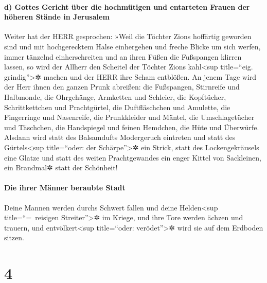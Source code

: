 \hypertarget{d-gottes-gericht-uxfcber-die-hochmuxfctigen-und-entarteten-frauen-der-huxf6heren-stuxe4nde-in-jerusalem}{%
\paragraph{d) Gottes Gericht über die hochmütigen und entarteten Frauen
der höheren Stände in
Jerusalem}\label{d-gottes-gericht-uxfcber-die-hochmuxfctigen-und-entarteten-frauen-der-huxf6heren-stuxe4nde-in-jerusalem}}

Weiter hat der HERR gesprochen: »Weil die Töchter Zions
hoffärtig geworden sind und mit hochgerecktem Halse einhergehen und
freche Blicke um sich werfen, immer tänzelnd einherschreiten und an
ihren Füßen die Fußspangen klirren lassen, so wird der
Allherr den Scheitel der Töchter Zions kahl\textless sup title=``eig.
grindig''\textgreater✲ machen und der HERR ihre Scham entblößen.
An jenem Tage wird der Herr ihnen den ganzen Prunk
abreißen: die Fußspangen, Stirnreife und Halbmonde, die
Ohrgehänge, Armketten und Schleier, die Kopftücher,
Schrittkettchen und Prachtgürtel, die Duftfläschchen und Amulette,
die Fingerringe und Nasenreife, die
Prunkkleider und Mäntel, die Umschlagetücher und Täschchen,
die Handspiegel und feinen Hemdchen, die Hüte und
Überwürfe. Alsdann wird statt des Balsamdufts Modergeruch
eintreten und statt des Gürtels\textless sup title=``oder: der
Schärpe''\textgreater✲ ein Strick, statt des Lockengekräusels eine
Glatze und statt des weiten Prachtgewandes ein enger Kittel von
Sackleinen, ein Brandmal✲ statt der Schönheit!

\hypertarget{die-ihrer-muxe4nner-beraubte-stadt}{%
\paragraph{Die ihrer Männer beraubte
Stadt}\label{die-ihrer-muxe4nner-beraubte-stadt}}

Deine Mannen werden durchs Schwert fallen und deine
Helden\textless sup title=``=~reisigen Streiter''\textgreater✲ im
Kriege, und ihre Tore werden ächzen und trauern, und
entvölkert\textless sup title=``oder: verödet''\textgreater✲ wird sie
auf dem Erdboden sitzen.

\hypertarget{section-3}{%
\section{4}\label{section-3}}


